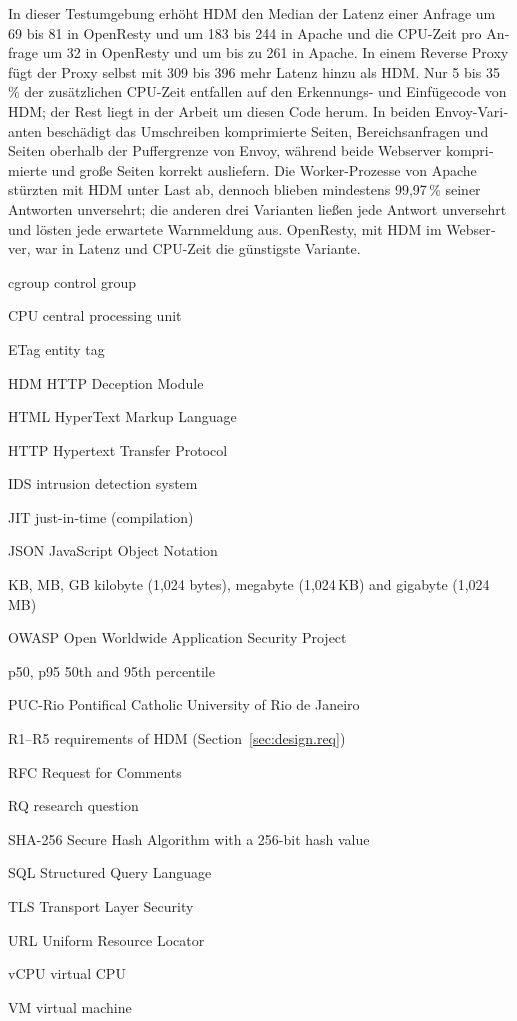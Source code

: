 \documentclass{rptuma}
\begin{document}
\begin{otherlanguage}{german}
In dieser Testumgebung erhöht HDM den Median der Latenz einer Anfrage um 69 bis 81\us{} in
OpenResty und um 183 bis 244\us{} in Apache und die CPU-Zeit pro Anfrage um 32\us{} in
OpenResty und um bis zu 261\us{} in Apache. In einem Reverse Proxy fügt der Proxy selbst mit 309 bis
396\us{} mehr Latenz hinzu als HDM. Nur 5 bis 35\,\% der zusätzlichen CPU-Zeit entfallen auf den
Erkennungs- und Einfügecode von HDM; der Rest liegt in der Arbeit um diesen Code herum. In beiden
Envoy-Varianten beschädigt das Umschreiben komprimierte Seiten, Bereichsanfragen und Seiten
oberhalb der Puffergrenze von Envoy, während beide Webserver komprimierte und große Seiten korrekt
ausliefern. Die Worker-Prozesse von Apache stürzten mit HDM unter Last ab, dennoch blieben
mindestens 99,97\,\% seiner Antworten unversehrt; die anderen drei Varianten ließen jede Antwort
unversehrt und lösten jede erwartete Warnmeldung aus. OpenResty, mit HDM im Webserver, war in
Latenz und CPU-Zeit die günstigste Variante.
\end{otherlanguage}

\tableofcontents

\listoffigures

\listoftables

\begin{glossar}
  \item[cgroup] control group
  \item[CPU] central processing unit
  \item[ETag] entity tag
  \item[HDM] HTTP Deception Module
  \item[HTML] HyperText Markup Language
  \item[HTTP] Hypertext Transfer Protocol
  \item[IDS] intrusion detection system
  \item[JIT] just-in-time (compilation)
  \item[JSON] JavaScript Object Notation
  \item[KB, MB, GB] kilobyte (1,024 bytes), megabyte (1,024\,KB) and gigabyte (1,024\,MB)
  \item[OWASP] Open Worldwide Application Security Project
  \item[p50, p95] 50th and 95th percentile
  \item[PUC-Rio] Pontifical Catholic University of Rio de Janeiro
  \item[R1--R5] requirements of HDM (Section~\ref{sec:design.req})
  \item[RFC] Request for Comments
  \item[RQ] research question
  \item[SHA-256] Secure Hash Algorithm with a 256-bit hash value
  \item[SQL] Structured Query Language
  \item[TLS] Transport Layer Security
  \item[URL] Uniform Resource Locator
  \item[vCPU] virtual CPU
  \item[VM] virtual machine
\end{glossar}
\end{document}
